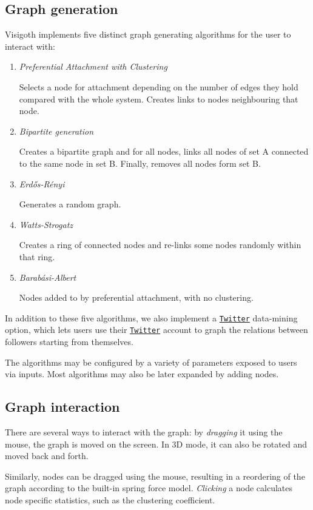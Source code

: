 \documentclass[a4paper,11pt,titlepage]{article}
\let\stdhref\href
\renewcommand{\href}[2]{\stdhref{#1}{\texttt{#2}}}
\newcommand{\Twitter}{\href{http://twitter.com}{Twitter} }
\begin{document}
\subsection{Graph generation}
Visigoth implements five distinct graph generating algorithms for the user to interact with:
\begin{enumerate}
\item \emph{Preferential Attachment with Clustering}

Selects a node for attachment depending on the number of edges they hold
compared with the whole system. Creates links to nodes neighbouring that node.

\item \emph{Bipartite generation}

Creates a bipartite graph and for all nodes, links all nodes of set A connected to
the same node in set B. Finally, removes all nodes form set B.

\item \emph{Erd\H{o}s-R\'{e}nyi}

Generates a random graph.

\item \emph{Watts-Strogatz}

Creates a ring of connected nodes and re-links some nodes randomly within that ring.

\item \emph{Barab\'{a}si-Albert}

Nodes added to by preferential attachment, with no clustering.

\end{enumerate}

In addition to these five algorithms, we also implement a \Twitter data-mining option,
which lets users use their \Twitter account to graph the relations between followers
starting from themselves.

The algorithms may be configured by a variety of parameters exposed to users
via inputs. Most algorithms may also be later expanded by adding nodes.

\subsection{Graph interaction}
There are several ways to interact with the graph: by \emph{dragging} it using the mouse,
 the graph is moved on the screen. In 3D mode, it can also be rotated and moved
back and forth.

Similarly, nodes can be dragged using the mouse, resulting in a reordering of the
graph according to the built-in spring force model. \emph{Clicking} a node calculates
node specific statistics, such as the clustering coefficient.
\end{document}
